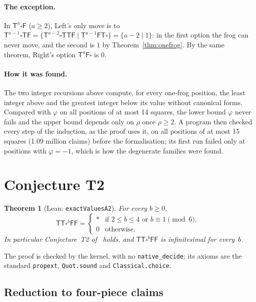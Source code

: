 \documentclass[11pt,a4paper]{article}
\newcommand{\Tt}{\mathsf{T}}
\newcommand{\Ff}{\mathsf{F}}
\newcommand{\E}{\square}
\newcommand{\lean}[1]{\texttt{#1}}
\theoremstyle{plain}
\newtheorem{theorem}{Theorem}
\theoremstyle{remark}
\begin{document}
\paragraph{The exception.} In $\Tt^a\E\Ff$ ($a\ge2$), Left's only move is to
$\Tt^{a-1}\E\Tt\Ff=\{\Tt^{a-2}\E\Tt\Tt\Ff\mid\Tt^{a-1}\Ff\Tt\E\}=\{a-2\mid1\}$: in the first option
the frog can never move, and the second is $1$ by Theorem~\ref{thm:onefrog}. By the same theorem, Right's option
$\Tt^a\Ff\E$ is $0$.

\paragraph{How it was found.} The two integer recursions above compute, for every one-frog
position, the least integer above and the greatest integer below its value without canonical
forms. Compared with $\varphi$ on all positions of at most 14 squares, the lower bound $\varphi$
never fails and the upper bound depends only on $\rho$ once $\rho\ge2$. A program then checked
every step of the induction, as the proof uses it, on all positions of at most 15 squares
(1.09 million claims) before the formalisation; its first run failed only at positions with
$\varphi=-1$, which is how the degenerate families were found.

\section{Conjecture T2}\label{sec:T2}

\begin{theorem}[Lean: \lean{exactValuesA2}]\label{thm:T2}
For every $b\ge0$,
\[
\Tt\Tt\E^b\Ff\Ff =
\begin{cases}
\ast & \text{if } 2\le b\le 4 \text{ or } b\equiv 1 \pmod 6,\\
0 & \text{otherwise.}
\end{cases}
\]
In particular Conjecture~T2 of~\cite{T11} holds, and $\Tt\Tt\E^b\Ff\Ff$ is infinitesimal for
every~$b$.
\end{theorem}

The proof is checked by the kernel, with no \lean{native\_decide}; its axioms are the standard
\lean{propext}, \lean{Quot.sound} and \lean{Classical.choice}.

\subsection{Reduction to four-piece claims}
\end{document}
